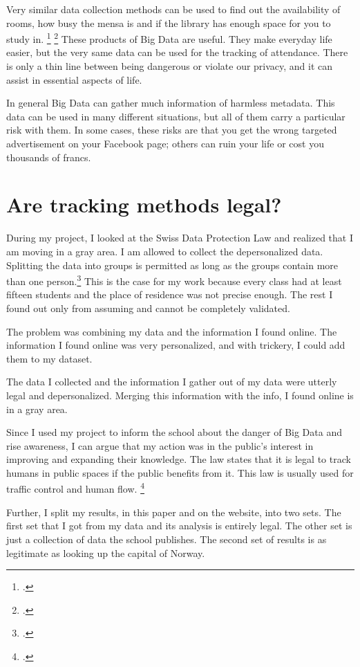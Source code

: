 \documentclass[paper=a4, fontsize=11pt]{article}
\begin{document}
Very similar data collection methods can be used to find out the availability of rooms, how busy the mensa is and if the library has enough space for you to study in. \footcite{waitz} \footcite{trackingpublic} These products of Big Data are useful. They make everyday life easier, but the very same data can be used for the tracking of attendance. There is only a thin line between being dangerous or violate our privacy, and it can assist in essential aspects of life.

In general Big Data can gather much information of harmless metadata. This data can be used in many different situations, but all of them carry a particular risk with them. In some cases, these risks are that you get the wrong targeted advertisement on your Facebook page; others can ruin your life or cost you thousands of francs.

\section{Are tracking methods legal?}
During my project, I looked at the Swiss Data Protection Law and realized that I am moving in a gray area. I am allowed to collect the depersonalized data. Splitting the data into groups is permitted as long as the groups contain more than one person.\footcite{swissdataprotection} This is the case for my work because every class had at least fifteen students and the place of residence was not precise enough. The rest I found out only from assuming and cannot be completely validated.

The problem was combining my data and the information I found online. The information I found online was very personalized, and with trickery, I could add them to my dataset.

The data I collected and the information I gather out of my data were utterly legal and depersonalized. Merging this information with the info, I found online is in a gray area.

Since I used my project to inform the school about the danger of Big Data and rise awareness, I can argue that my action was in the public's interest in improving and expanding their knowledge. The law states that it is legal to track humans in public spaces if the public benefits from it. This law is usually used for traffic control and human flow. \footcite{swissdataprotection}

Further, I split my results, in this paper and on the website, into two sets. The first set that I got from my data and its analysis is entirely legal. The other set is just a collection of data the school publishes. The second set of results is as legitimate as looking up the capital of Norway.
\end{document}
